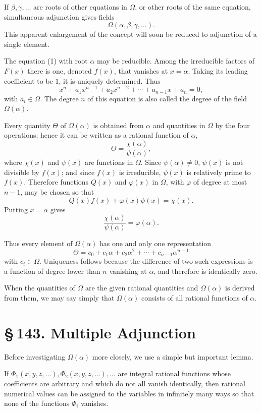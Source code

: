\documentclass[11pt]{article}
\providecommand{\sect}[2]{\section*{\S\,#1. #2}}
\begin{document}
If $\beta,\gamma,\ldots$ are roots of other equations in $\Omega$, or other roots of the same equation, simultaneous adjunction gives fields
\[
        \Omega(\alpha,\beta,\gamma,\ldots).
\]
This apparent enlargement of the concept will soon be reduced to adjunction of a single element.

The equation (1) with root $\alpha$ may be reducible. Among the irreducible factors of $F(x)$ there is one, denoted $f(x)$, that vanishes at $x=\alpha$. Taking its leading coefficient to be $1$, it is uniquely determined. Thus
\[
\tag{2}
        x^n+a_1x^{n-1}+a_2x^{n-2}+\cdots+a_{n-1}x+a_n=0,
\]
with $a_i\in\Omega$. The degree $n$ of this equation is also called the degree of the field $\Omega(\alpha)$.

Every quantity $\Theta$ of $\Omega(\alpha)$ is obtained from $\alpha$ and quantities in $\Omega$ by the four operations; hence it can be written as a rational function of $\alpha$,
\[
\tag{3}
        \Theta=\frac{\chi(\alpha)}{\psi(\alpha)},
\]
where $\chi(x)$ and $\psi(x)$ are functions in $\Omega$. Since $\psi(\alpha)\ne0$, $\psi(x)$ is not divisible by $f(x)$; and since $f(x)$ is irreducible, $\psi(x)$ is relatively prime to $f(x)$. Therefore functions $Q(x)$ and $\varphi(x)$ in $\Omega$, with $\varphi$ of degree at most $n-1$, may be chosen so that
\[
\tag{4}
        Q(x)f(x)+\varphi(x)\psi(x)=\chi(x).
\]
Putting $x=\alpha$ gives
\[
\tag{5}
        \frac{\chi(\alpha)}{\psi(\alpha)}=\varphi(\alpha).
\]

Thus every element of $\Omega(\alpha)$ has one and only one representation
\[
        \Theta=c_0+c_1\alpha+c_2\alpha^2+\cdots+c_{n-1}\alpha^{n-1}
\]
with $c_i\in\Omega$. Uniqueness follows because the difference of two such expressions is a function of degree lower than $n$ vanishing at $\alpha$, and therefore is identically zero.

When the quantities of $\Omega$ are the given rational quantities and $\Omega(\alpha)$ is derived from them, we may say simply that $\Omega(\alpha)$ consists of all rational functions of $\alpha$.

\sect{143}{Multiple Adjunction}

Before investigating $\Omega(\alpha)$ more closely, we use a simple but important lemma.

If $\Phi_1(x,y,z,\ldots),\Phi_2(x,y,z,\ldots),\ldots$ are integral rational functions whose coefficients are arbitrary and which do not all vanish identically, then rational numerical values can be assigned to the variables in infinitely many ways so that none of the functions $\Phi_i$ vanishes.
\end{document}
